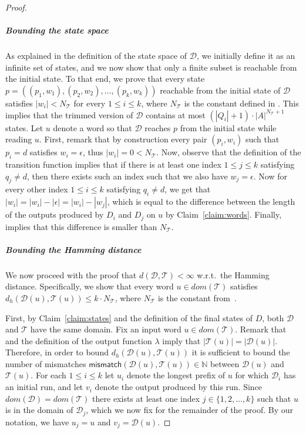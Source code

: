 \documentclass[a4paper,UKenglish,cleveref, autoref, thm-restate,authorcolumns, colorlinks]{lipics-v2021}
\newcommand\dom{\mathit{dom}}
\newcommand\calD{\mathcal{D}}
\newcommand\calT{\mathcal{T}}
\newcommand{\dHam}[2]{d_{h}(#1,#2)}
\begin{document}
{\begin{proof}
    \subparagraph*{Bounding the state space}
    As explained in the definition of the state space of $\calD$,
    we initially define it as an infinite set of states, and we now show that
    only a finite subset is reachable from the initial state.
    To that end, we prove that every state $p =  ((p_1,w_1), (p_2,w_2), \ldots, (p_k,w_k))$
    reachable from the initial state of $\calD$ satisfies $|w_i| < N_\calT$ for every $1 \leq i \leq k$, where $N_\calT$ is the constant defined in .
    This implies that the trimmed version of $\calD$ contains at most $(|Q_i| + 1) \cdot |A|^{N_\calT+1}$ states.
    Let $u$ denote a word so that $\calD$ reaches $p$ from the initial state while reading $u$.
    First, remark that by construction every pair $(p_i,w_i)$ such that $p_i = d$
    satisfies $w_i = \epsilon$, thus $|w_i| = 0 < N_\calT$.
    Now, observe that the definition of the transition function implies that
    if there is at least one index $1 \leq j \leq k$ satisfying $q_j \neq d$,
    then there exists such an index such that we also have $w_j = \epsilon$.
    Now for every other index $1 \leq i \leq k$ satisfying $q_i \neq d$,
    we get that $|w_i| = |w_i| - |\epsilon| = |w_i| - |w_j|$,
    which is equal to the difference between the length of the outputs produced by $D_i$ and $D_j$
    on $u$  by Claim~\ref{claim:words}.
    Finally,~ implies that this difference is smaller than $N_\calT$.


    \subparagraph*{Bounding the Hamming distance}
    We now proceed with the proof that $d(\calD,\calT) < \infty$ w.r.t.~the Hamming distance.
    Specifically, we show that every word $u \in \dom(\calT)$ satisfies
    $\dHam{\calD(u)}{\calT(u)} \leq k \cdot N_\calT$,
    where $N_\calT$ is the constant from~.
    
    First, by Claim~\ref{claim:states} and the definition of the final states of $D$,
    both $\calD$ and $\calT$ have the same domain.
    Fix an input word $u \in \dom(\calT)$.
    Remark that  and the definition
    of the output function $\lambda$ imply that
    $|\calT(u)| = |\calD(u)|$.
    Therefore, in order to bound $\dHam{\calD(u)}{\calT(u)}$
    it is sufficient to bound the number of mismatches
    $\textsf{mismatch}(\calD(u),\calT(u)) \in \mathbb{N}$ between $\calD(u)$ and $\calT(u)$.
    For each $1 \leq i \leq k$
    let $u_i$ denote the longest prefix of $u$
    for which $\calD_i$ has an initial run,
    and let $v_i$ denote the output produced by this run.
    Since $\dom(\calD) = \dom(\calT)$ there exists at least one index $j \in \{1,2,\ldots,k\}$
    such that $u$ is in the domain of $\calD_j$, which we now fix for the remainder of the proof.
    By our notation, we have $u_j = u$ and $v_j = \calD(u)$.


\end{proof}}
\end{document}
